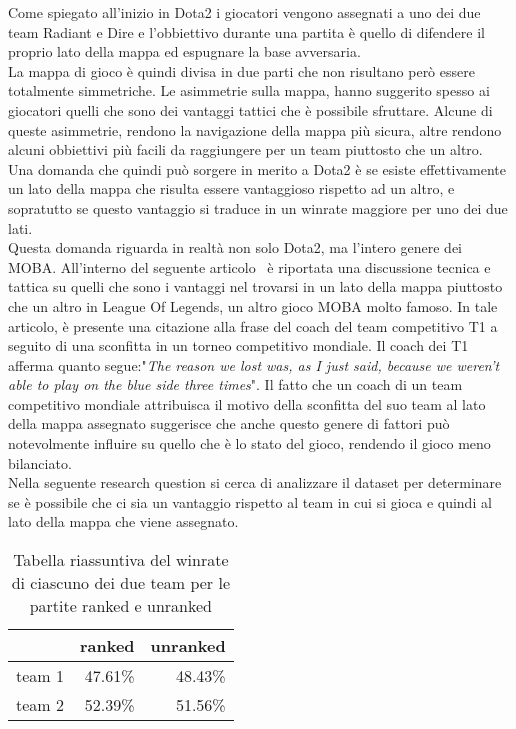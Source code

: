 Come spiegato all'inizio in Dota2 i giocatori vengono assegnati a uno dei due team Radiant e Dire e l'obbiettivo durante una partita è quello di difendere il proprio lato della mappa ed espugnare la base avversaria. \\
La mappa di gioco è quindi divisa in due parti che non risultano però essere totalmente simmetriche. Le asimmetrie sulla mappa, hanno suggerito spesso ai giocatori quelli che sono dei vantaggi tattici che è possibile sfruttare. Alcune di queste asimmetrie, rendono la navigazione della mappa più sicura, altre rendono alcuni obbiettivi più facili da raggiungere per un team piuttosto che un altro. \\
Una domanda che quindi può sorgere in merito a Dota2 è se esiste effettivamente un lato della mappa che risulta essere vantaggioso rispetto ad un altro, e sopratutto se questo vantaggio si traduce in un winrate maggiore per uno dei due lati. \\
Questa domanda riguarda in realtà non solo Dota2, ma l'intero genere dei MOBA. All'interno del seguente articolo~\cite{WinRateLol} è riportata una discussione tecnica e tattica su quelli che sono i vantaggi nel trovarsi in un lato della mappa piuttosto che un altro in League Of Legends, un altro gioco MOBA molto famoso. In tale articolo, è presente una citazione alla frase del coach del team competitivo T1 a seguito di una sconfitta in un torneo competitivo mondiale. Il coach dei T1 afferma quanto segue:"\textit{The reason we lost was, as I just said, because we weren’t able to play on the blue side three times}". 
Il fatto che un coach di un team competitivo mondiale attribuisca il motivo della sconfitta del suo team al lato della mappa assegnato suggerisce che anche questo genere di fattori può notevolmente influire su quello che è lo stato del gioco, rendendo il gioco meno bilanciato. \\
Nella seguente research question si cerca di analizzare il dataset per determinare se è possibile che ci sia un vantaggio rispetto al team in cui si gioca e quindi al lato della mappa che viene assegnato.
\begin{table}
\centering
\caption{Tabella riassuntiva del winrate di ciascuno dei due team per le partite ranked e unranked}
\label{winrate_team}
\begin{tabular}{|r|r|r|}
\hline
\multicolumn{1}{|l|}{} & \multicolumn{1}{l|}{ranked} & \multicolumn{1}{l|}{unranked} \\ \hline
team 1  &  47.61\%  &   48.43\% \\ \hline
team 2  &  52.39\%  &   51.56\%  \\ \hline
\end{tabular}
\end{table}
